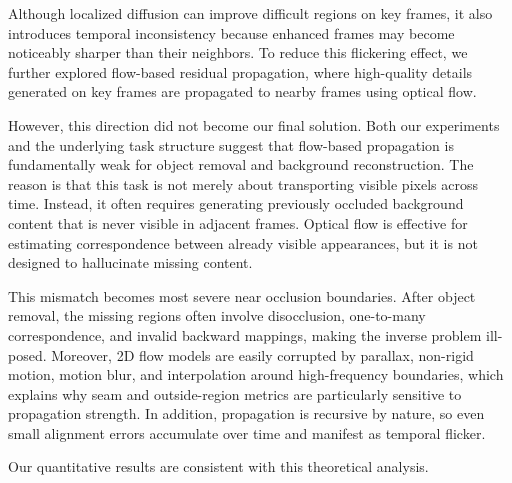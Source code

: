 Although localized diffusion can improve difficult regions on key frames, it also introduces temporal inconsistency because enhanced frames may become noticeably sharper than their neighbors.
To reduce this flickering effect, we further explored flow-based residual propagation, where high-quality details generated on key frames are propagated to nearby frames using optical flow.

However, this direction did not become our final solution.
Both our experiments and the underlying task structure suggest that flow-based propagation is fundamentally weak for object removal and background reconstruction.
The reason is that this task is not merely about transporting visible pixels across time.
Instead, it often requires generating previously occluded background content that is never visible in adjacent frames.
Optical flow is effective for estimating correspondence between already visible appearances, but it is not designed to hallucinate missing content.

This mismatch becomes most severe near occlusion boundaries.
After object removal, the missing regions often involve disocclusion, one-to-many correspondence, and invalid backward mappings, making the inverse problem ill-posed.
Moreover, 2D flow models are easily corrupted by parallax, non-rigid motion, motion blur, and interpolation around high-frequency boundaries, which explains why seam and outside-region metrics are particularly sensitive to propagation strength.
In addition, propagation is recursive by nature, so even small alignment errors accumulate over time and manifest as temporal flicker.

Our quantitative results are consistent with this theoretical analysis.

